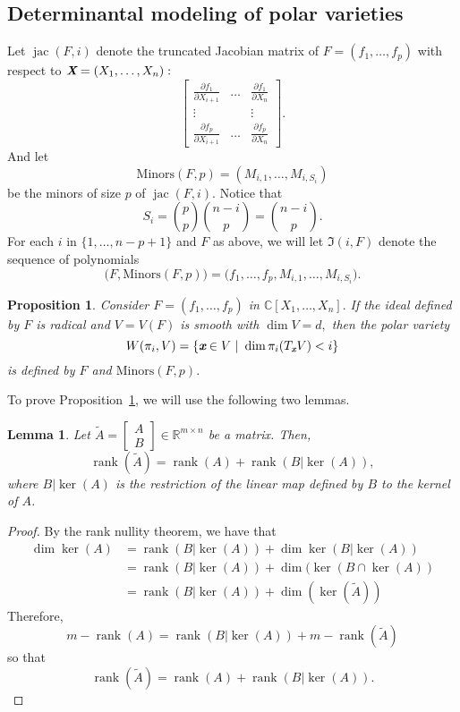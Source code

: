 \documentclass[a4paper]{article}
\def\Xb{\textit{\textbf{X}}}
\def\xb{\textit{\textbf{x}}}
\def\At{\widetilde{A}}
\DeclareMathOperator{\jac}{jac}
\DeclareMathOperator{\rank}{rank}
\def\minors{\textrm{Minors}(F,p)}
\def\pa{\partial}
\def\C{\mathbb{C}}
\def\Ii{\mathfrak{I}(i,F)}
\def\bbm{\begin{bmatrix}}
\def\ebm{\end{bmatrix}}
\newtheorem{lemma}[theorem]{Lemma}
\newtheorem{prop}[theorem]{Proposition}
\begin{document}
\subsection{Determinantal modeling of polar varieties} 
Let $\jac(F,i)$ denote the truncated Jacobian matrix of $F=(f_1,\hdots,f_p)$ with respect to $\Xb = (X_1,\hdots,X_n):$
\[
\left[ 
\begin{array}{ccc}
\frac{\pa f_1}{\pa X_{i+1}}&\hdots& \frac{\pa f_1}{\pa X_{n}} \\
\vdots& &\vdots\\
\frac{\pa f_p}{\pa X_{i+1}}&\hdots& \frac{\pa f_p}{\pa X_{n}} 
\end{array}
\right]. 
\]
And let \[\minors = \left(M_{i,1},\hdots,M_{i,S_i}\right)\] be the minors of size $p$ of $\jac(F,i)$. Notice that
\[
S_i = \binom{p}{p}\binom{n-i}{p}=\binom{n-i}{p}.
\]
%
For each $i$ in $\{1,\dots,n-p+1\}$ and $F$ as above, we will let $\Ii$
denote the sequence of polynomials 
\[
\big( F, \minors \big) = \big(f_1,\hdots,f_p,M_{i,1},\hdots,M_{i,S_{i}}\big).
\]
%
\begin{prop}\label{prop:3.1}
Consider $F=(f_1,\hdots,f_p)$ in $\C[X_1,\hdots,X_n].$ If the ideal defined by $F$ is radical and $V = V(F)$ is smooth with $\dim V= d,$ then the polar variety \[W(\pi_i,V) = \{\xb \in V~|~\dim \pi_i(T_{\xb}V) < i\}\] is defined by $F$ and $\minors$.  
\end{prop}
%
\noindent 
To prove Proposition~\ref{prop:3.1}, we will use the following two lemmas.
%
\begin{lemma}\label{lem:3.2} 
Let $\widetilde{A} = \bbm A \\ B \ebm \in \mathbb{R}^{m\times n}$ be a matrix. Then, 
\[ 
\rank(\widetilde{A}) = 
\rank(A) + \rank(B|\ker(A)),
\]
where $B|\ker(A)$ is the restriction of the linear map defined by $B$ to the kernel of $A$. 
\end{lemma}
%
\begin{proof}
By the rank nullity theorem, we have that \begin{align*} 
\dim \ker(A) &= 
\rank(B|\ker(A)) +
\dim \ker(B| \ker(A)) \\
&= \rank(B|\ker(A)) +
\dim (\ker(B \cap \ker(A)) \\
&= \rank(B|\ker(A)) +
\dim (\ker(\widetilde{A}))
\end{align*}
Therefore, 
\[
m - \rank(A) = \rank(B|\ker(A)) + m - \rank(\At)
\]
so that 
\[
\rank(\At) = \rank(A) + \rank(B| \ker (A)).
\]
\end{proof}
\end{document}
